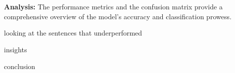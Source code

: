 \documentclass[12pt]{article}
\begin{document}
\\~\\


\textbf{Analysis:} The performance metrics and the confusion matrix provide a comprehensive overview of the model's accuracy and classification prowess.

looking at the sentences that underperformed

insights

conclusion
\end{document}

